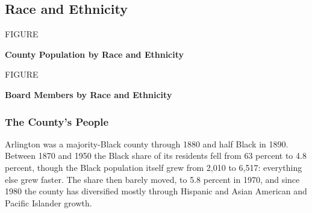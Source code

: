 \subsection{Race and Ethnicity}


\begin{pairpage}
  \label{fig:residents-race}
  {\raggedright\MakeUppercase{Figure \thefigure}\par}
  {\raggedright\bfseries County Population by Race and Ethnicity\par}
  \smallskip
  \vspace{2pt}
  \vfill
  \label{fig:board-race}
  {\raggedright\MakeUppercase{Figure \thefigure}\par}
  {\raggedright\bfseries Board Members by Race and Ethnicity\par}
  \smallskip
  \vspace{2pt}
  \figurenotes{}{}
\end{pairpage}

\subsubsection{The County's People}

Arlington was a majority-Black county through 1880 and half Black in 1890.
Between 1870 and 1950 the Black share of its residents fell from 63 percent to
4.8 percent, though the Black population itself grew from 2,010 to 6,517:
everything else grew faster. The share then barely moved, to 5.8 percent in
1970, and since 1980 the county has diversified mostly through Hispanic and
Asian American and Pacific Islander growth.


